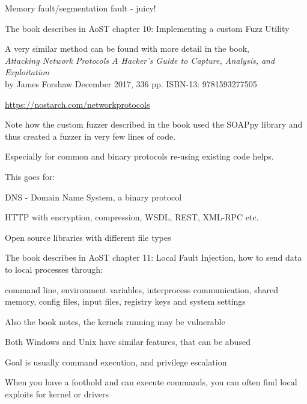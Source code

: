 \documentclass[Screen16to9,17pt]{foils}
\begin{document}
\centerline{Memory fault/segmentation fault - juicy!}




The book describes in AoST chapter 10: Implementing a custom Fuzz Utility

A very similar method can be found with more detail in the book,\\
\emph{Attacking Network Protocols A Hacker's Guide to Capture, Analysis, and Exploitation}\\
by James Forshaw December 2017, 336 pp. ISBN-13: 9781593277505

\url{https://nostarch.com/networkprotocols}


Note how the custom fuzzer described in the book used the SOAPpy library and thus created a fuzzer in very few lines of code.

Especially for common and binary protocols re-using existing code helps.

This goes for:
\begin{list2}
\item DNS - Domain Name System, a binary protocol
\item HTTP with encryption, compression, WSDL, REST, XML-RPC etc.
\item Open source libraries with different file types
\end{list2}



The book describes in AoST chapter 11: Local Fault Injection, how to send data to local processes through:

\begin{list2}
\item command line, environment variables, interprocess communication, shared memory, config files, input files, registry keys and system settings
\item Also the book notes, the kernels running may be vulnerable
\item Both Windows and Unix have similar features, that can be abused
\item Goal is usually command execution, and privilege escalation
\item When you have a foothold and can execute commands, you can often find local exploits for kernel or drivers
\end{list2}
\end{document}
